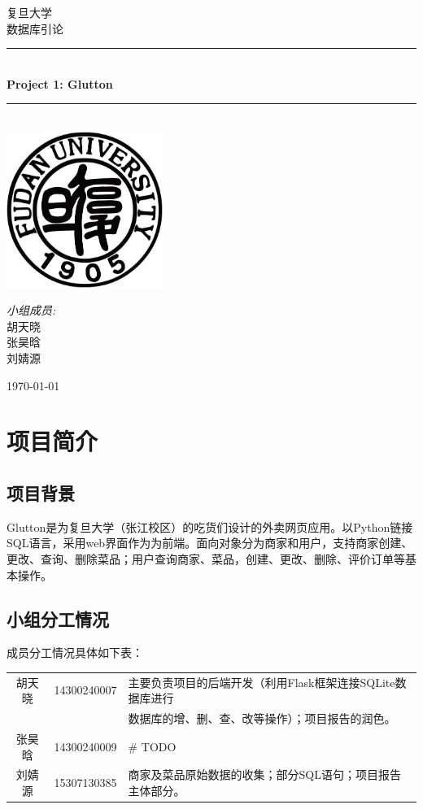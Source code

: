 \documentclass[12pt, oneside,a4paper]{article}
\newcommand{\HRule}{\rule{\linewidth}{0.5mm}}
\begin{document}
\begin{titlepage}
\begin{center}
\textsc{\LARGE 复旦大学}\\[1.5cm]
\textsc{\Large 数据库引论}\\[0.5cm]
\HRule \\[0.4cm]
{ \huge \bfseries Project 1: Glutton}\\[0.4cm]
\HRule \\[1.5cm]
\includegraphics[width=2in]{logo.jpg}\\[1cm]
\begin{minipage}{0.4\textwidth}
\begin{flushleft} \large
\begin{center}
\emph{小组成员:}\\
胡天晓\\
张昊晗\\
刘婧源
\end{center}
\end{flushleft}
\end{minipage}
\vfill
{\large \today}
\end{center}
\end{titlepage}

\section{项目简介}
\subsection{项目背景}
Glutton是为复旦大学（张江校区）的吃货们设计的外卖网页应用。以Python链接SQL语言，采用web界面作为为前端。面向对象分为商家和用户，支持商家创建、更改、查询、删除菜品；用户查询商家、菜品，创建、更改、删除、评价订单等基本操作。
\subsection{小组分工情况}
成员分工情况具体如下表：
\begin{table}[!h]
\begin{tabular}{|c|c|l|}
\hline
胡天晓 & 14300240007 & 主要负责项目的后端开发（利用Flask框架连接SQLite数据库进行\\
 & & 数据库的增、删、查、改等操作）；项目报告的润色。 \\
\hline
张昊晗 & 14300240009 & \# TODO \\
\hline
刘婧源 & 15307130385 & 商家及菜品原始数据的收集；部分SQL语句；项目报告主体部分。\\
\hline
\end{tabular}
\end{table} 
\end{document}
